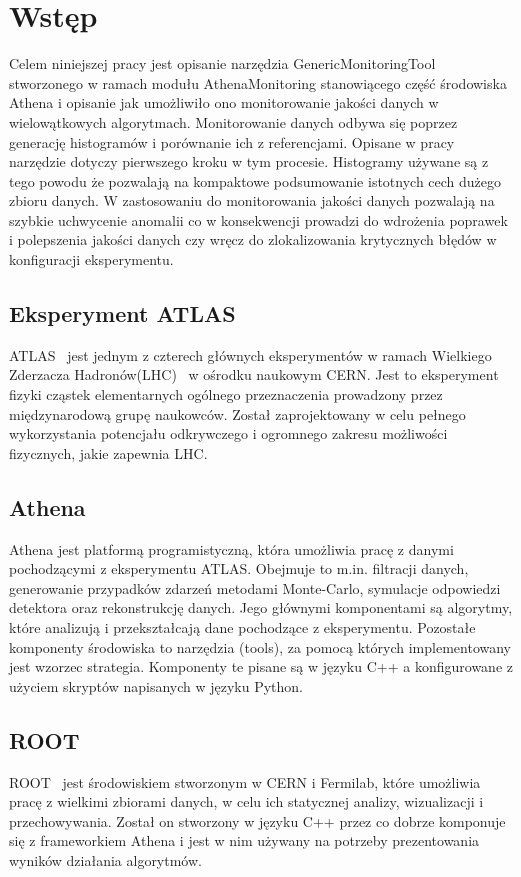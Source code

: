 \section{Wstęp}
Celem niniejszej pracy jest opisanie narzędzia \mbox{GenericMonitoringTool} stworzonego w ramach modułu \mbox{AthenaMonitoring} stanowiącego część środowiska Athena\cite{Athena} i opisanie jak umożliwiło ono monitorowanie jakości danych w wielowątkowych algorytmach. 
Monitorowanie danych odbywa się poprzez generację histogramów i porównanie ich z referencjami. Opisane w pracy narzędzie dotyczy pierwszego kroku w tym procesie.
Histogramy używane są z tego powodu że pozwalają na kompaktowe podsumowanie istotnych cech dużego zbioru danych. 
W zastosowaniu do monitorowania jakości danych pozwalają na szybkie uchwycenie anomalii co w konsekwencji prowadzi do wdrożenia poprawek i polepszenia jakości danych czy wręcz do zlokalizowania krytycznych błędów w konfiguracji eksperymentu. 

\subsection{Eksperyment ATLAS} 
ATLAS~\cite{} jest jednym z czterech głównych eksperymentów w ramach Wielkiego Zderzacza Hadronów(LHC)~\cite{} w ośrodku naukowym CERN. 
Jest to eksperyment fizyki cząstek elementarnych ogólnego przeznaczenia prowadzony przez międzynarodową grupę naukowców. 
Został zaprojektowany w celu pełnego wykorzystania potencjału odkrywczego i ogromnego zakresu możliwości fizycznych, jakie zapewnia LHC.

\subsection{Athena} 
Athena jest platformą programistyczną, która umożliwia pracę z danymi pochodzącymi z eksperymentu ATLAS. 
Obejmuje to m.in. filtracji danych, generowanie przypadków zdarzeń metodami Monte-Carlo, symulacje odpowiedzi detektora oraz rekonstrukcję danych. 
Jego głównymi komponentami są algorytmy, które analizują i przekształcają dane pochodzące z eksperymentu. 
Pozostałe komponenty środowiska to narzędzia (tools), za pomocą których implementowany jest wzorzec strategia. 
Komponenty te pisane są w języku C++ a konfigurowane z użyciem skryptów napisanych w języku Python. 

\subsection{ROOT} 
ROOT~\cite{} jest środowiskiem stworzonym w CERN i Fermilab, które umożliwia pracę z wielkimi zbiorami danych, w celu ich statycznej analizy, wizualizacji i przechowywania. 
Został on stworzony w języku C++ przez co dobrze komponuje się z frameworkiem Athena i jest w nim używany na potrzeby prezentowania wyników działania algorytmów. 

